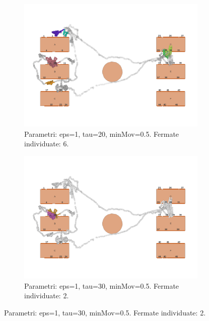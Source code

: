 \documentclass[12pt]{article}
\begin{document}
\begin{figure}[htb!]
    \centering
    \begin{subfigure}[b]{0.45\textwidth}
        \centering
        \includegraphics[width=\textwidth]{images/stop_points_p57_SOC_eps1_tau20_minMov05.png}
        \caption{Parametri: eps=1, tau=20, minMov=0.5. Fermate individuate: 6.}
        \label{stop_points_p57_SOC_eps1_tau20_minMov05}
    \end{subfigure}
    \hfill
    \begin{subfigure}[b]{0.45\textwidth}
        \centering
        \includegraphics[width=\textwidth]{images/stop_points_p57_SOC_eps1_tau30_minMov05.png}
        \caption{Parametri: eps=1, tau=30, minMov=0.5. Fermate individuate: 2.}
        \label{stop_points_p57_SOC_eps1_tau30_minMov05}
    \end{subfigure}

\end{figure}
\end{document}
